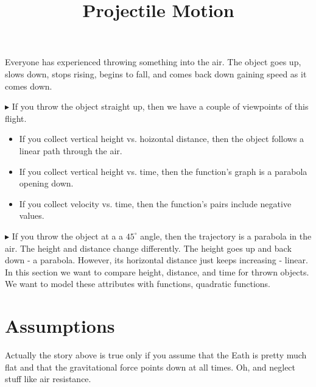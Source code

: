 \documentclass{ximera}
\title{Projectile Motion}
\begin{document}
\begin{abstract}
\end{abstract}
\maketitle



Everyone has experienced throwing something into the air. The object goes up, slows down, stops rising, begins to fall, and comes back down gaining speed as it comes down.  





$\blacktriangleright$ If you throw the object straight up, then we have a couple of viewpoints of this flight. 

\begin{itemize}
\item If you collect vertical height vs. hoizontal distance, then the object follows a linear path through the air.  
\item If you collect vertical height vs. time, then the function's graph is a parabola opening down.
\item If you collect velocity vs. time, then the function's pairs include negative values.
\end{itemize}




$\blacktriangleright$  If you throw the object at a a $45^{\circ}$ angle, then the trajectory is a parabola in the air.  The height and distance change differently.  The height goes up and back down - a parabola.  However, its horizontal distance just keeps increasing - linear. \\


In this section we want to compare height, distance, and time for thrown objects. \\

We want to model these attributes with functions, quadratic functions.



\section{Assumptions}

Actually the story above is true only if you assume that the Eath is pretty much flat and that the gravitational force points down at all times. Oh, and neglect stuff like air resistance.
\end{document}
